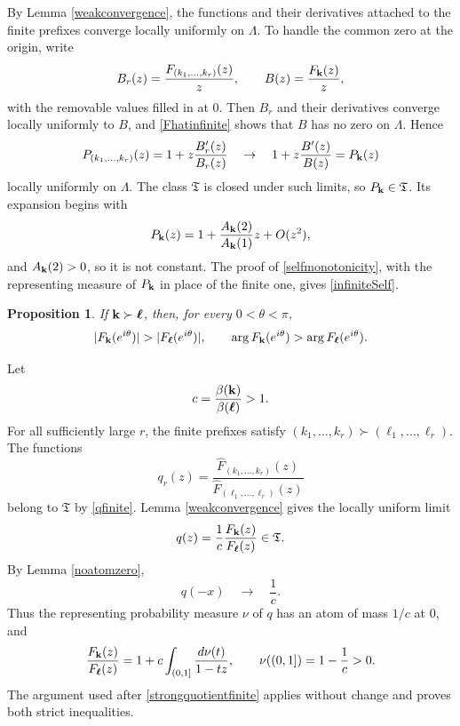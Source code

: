 \documentclass[12pt,a4paper]{amsart}
\makeatletter
\numberwithin{equation}{section}
\renewenvironment{proof}[1][Proof]{%
  \par\pushQED{\qed}%
  \normalfont\topsep6\p@\@plus6\p@\relax
  \trivlist
  \item[\hskip\labelsep\bfseries #1:]\ignorespaces
}{%
  \popQED\endtrivlist\@endpefalse
}
\theoremstyle{plain}
\newtheorem{prop}[Thm]{Proposition}
\theoremstyle{definition}
\makeatother
\begin{document}
\begin{proof}
By Lemma \ref{weakconvergence}, the functions and their derivatives attached to the finite prefixes converge locally uniformly on $\Lambda$.  To handle the common zero at the origin, write
\[
B_r(z)=\frac{F_{(k_1,\ldots,k_r)}(z)}z,
\qquad B(z)=\frac{F_{\bf k}(z)}z,
\]
with the removable values filled in at $0$.  Then $B_r$ and their derivatives converge locally uniformly to $B$, and \eqref{Fhatinfinite} shows that $B$ has no zero on $\Lambda$.  Hence
\[
P_{(k_1,\ldots,k_r)}(z)=1+z\frac{B_r'(z)}{B_r(z)}\quad
\rightarrow \quad1+z\frac{B'(z)}{B(z)}=P_{\bf k}(z)
\]
locally uniformly on $\Lambda$.  The class $\mathfrak{T}$ is closed under such limits, so $P_{\bf k}\in\mathfrak{T}$.  Its expansion begins with
\[
P_{\bf k}(z)=1+\frac{A_{\bf k}(2)}{A_{\bf k}(1)}z+O(z^2),
\]
and $A_{\bf k}(2)>0$, so it is not constant.  The proof of \eqref{selfmonotonicity}, with the representing measure of $P_{\bf k}$ in place of the finite one, gives \eqref{infiniteSelf}.
\end{proof}

\begin{prop}\label{infinitecross}
If ${\bf k}\succ{\boldsymbol\ell}$, then, for every $0<\theta<\pi$,
\[
|F_{\bf k}(e^{i\theta})|>|F_{\boldsymbol\ell}(e^{i\theta})|,
\qquad
\arg F_{\bf k}(e^{i\theta})>
\arg F_{\boldsymbol\ell}(e^{i\theta}).
\]
\end{prop}

\begin{proof}
Let
\[
c=\frac{\beta({\bf k})}{\beta({\boldsymbol\ell})}>1.
\]
For all sufficiently large $r$, the finite prefixes satisfy
$(k_1,\ldots,k_r)\succ(\ell_1,\ldots,\ell_r)$.  The functions
\[
q_r(z)=
\frac{\widehat F_{(k_1,\ldots,k_r)}(z)}
{\widehat F_{(\ell_1,\ldots,\ell_r)}(z)}
\]
belong to $\mathfrak{T}$ by \eqref{qfinite}.  Lemma \ref{weakconvergence} gives the locally uniform limit
\[
q(z)=\frac1c\frac{F_{\bf k}(z)}{F_{\boldsymbol\ell}(z)}
\in\mathfrak{T}.
\]
By Lemma \ref{noatomzero},
\[
q(-x)\quad\rightarrow\quad\frac1c.
\]
Thus the representing probability measure $\nu$ of $q$ has an atom of mass $1/c$ at $0$, and
\begin{equation}\label{strongquotientinfinite}
\frac{F_{\bf k}(z)}{F_{\boldsymbol\ell}(z)}
=1+c\int_{(0,1]}\frac{d\nu(t)}{1-tz},
\qquad
\nu((0,1])=1-\frac1c>0.
\end{equation}
The argument used after \eqref{strongquotientfinite} applies without change and proves both strict inequalities.
\end{proof}
\end{document}
